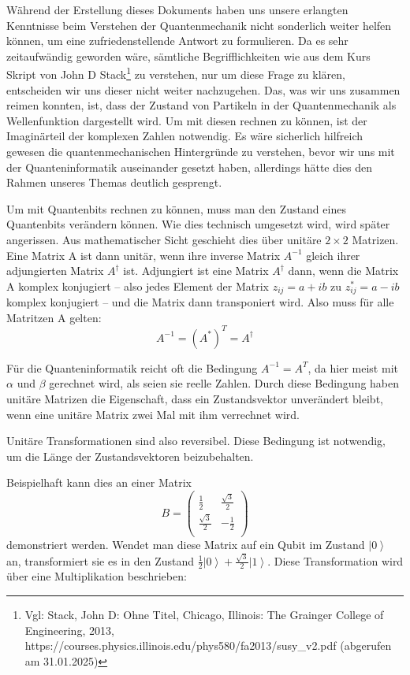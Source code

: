 \begin{tcolorbox}[title=Kommentar,
    title filled=false,
    colback=cyan!5!white,
    colframe=cyan!75!black]
Während der Erstellung dieses Dokuments haben uns unsere erlangten Kenntnisse beim Verstehen der Quantenmechanik nicht sonderlich weiter helfen können, um eine zufriedenstellende Antwort zu formulieren. Da es sehr zeitaufwändig geworden wäre, sämtliche Begrifflichkeiten wie aus dem Kurs Skript von John D Stack\footnote{Vgl: Stack, John D: Ohne Titel, Chicago, Illinois: The Grainger College of Engineering, 2013, https://courses.physics.illinois.edu/phys580/fa2013/susy\_v2.pdf (abgerufen am 31.01.2025)} zu verstehen, nur um diese Frage zu klären, entscheiden wir uns dieser nicht weiter nachzugehen. Das, was wir uns zusammen reimen konnten, ist, dass der Zustand von Partikeln in der Quantenmechanik als Wellenfunktion dargestellt wird. Um mit diesen rechnen zu können, ist der Imaginärteil der komplexen Zahlen notwendig. Es wäre sicherlich hilfreich gewesen die quantenmechanischen Hintergründe zu verstehen, bevor wir uns mit der Quanteninformatik auseinander gesetzt haben, allerdings hätte dies den Rahmen unseres Themas deutlich gesprengt.
\end{tcolorbox}

Um mit Quantenbits rechnen zu können, muss man den Zustand eines Quantenbits verändern können. Wie dies technisch umgesetzt wird, wird später angerissen. Aus mathematischer Sicht geschieht dies über unitäre $2\times2$ Matrizen. \\

Eine Matrix A ist dann unitär, wenn ihre inverse Matrix $A^{-1}$ gleich ihrer adjungierten Matrix $A^\dag$ ist. Adjungiert ist eine Matrix $A^\dag$ dann, wenn die Matrix A komplex konjugiert – also jedes Element der Matrix $z_{ij}=a+ib$ zu $z_{ij}^\ast=a-ib$ komplex konjugiert – und die Matrix dann transponiert wird. Also muss für alle Matritzen A gelten:
\begin{equation}
    A^{-1}=(A^*)^T=A^\dag
\end{equation}

Für die Quanteninformatik reicht oft die Bedingung $A^{-1}=A^T$, da hier meist mit $\alpha$ und $\beta$ gerechnet wird, als seien sie reelle Zahlen. Durch diese Bedingung haben unitäre Matrizen die Eigenschaft, dass ein Zustandsvektor unverändert bleibt, wenn eine unitäre Matrix zwei Mal mit ihm verrechnet wird. 

Unitäre Transformationen sind also reversibel. Diese Bedingung ist notwendig, um die Länge der Zustandsvektoren beizubehalten.

Beispielhaft kann dies an einer Matrix 
\begin{equation}
    B=\left(\begin{matrix}\frac{1}{2}&\frac{\sqrt3}{2}\\\frac{\sqrt3}{2}&-\frac{1}{2}\\\end{matrix}\right)
\end{equation} demonstriert werden. Wendet man diese Matrix auf ein Qubit im Zustand $\left|0\right\rangle$ an, transformiert sie es in den Zustand $\frac{1}{2}\left|0\right\rangle+\frac{\sqrt3}{2}\left|1\right\rangle$. Diese Transformation wird über eine Multiplikation beschrieben:

